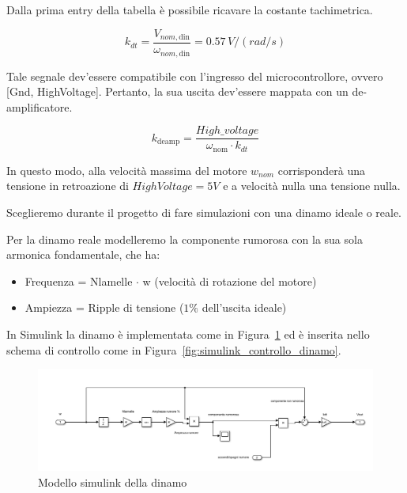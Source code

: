 \documentclass[a4paper,12pt]{article}
\begin{document}
Dalla prima entry della tabella è possibile ricavare la costante tachimetrica.

\[
    k_{dt} = \frac{V_{nom,\text{din}}}{\omega_{nom,\text{din}}} =0.57 \,V/(rad/s)
\]

Tale segnale dev'essere compatibile con l'ingresso del microcontrollore, ovvero [Gnd, HighVoltage]. Pertanto, la sua uscita dev'essere mappata con un de-amplificatore.

\[
    k_{\text{deamp}} = \frac{High\_voltage}{\omega_{\text{nom}} \cdot k_{dt}}
\]

\vspace{0.3cm}

In questo modo, alla velocità massima del motore $w_{nom}$ corrisponderà una tensione in retroazione di $HighVoltage = 5V$ e a velocità nulla una tensione nulla.

\vspace{0.5cm}
 
Sceglieremo durante il progetto di fare simulazioni con una dinamo ideale o reale.

Per la dinamo reale modelleremo la componente rumorosa con la sua sola armonica fondamentale, che ha: 

\begin{itemize}
    \item Frequenza = Nlamelle $\cdot$ w (velocità di rotazione del motore)
    \item Ampiezza = Ripple di tensione ($1\%$ dell'uscita ideale)
\end{itemize}

\vspace{0.5cm}

In Simulink la dinamo è implementata come in Figura~\ref{fig:simulink_dinamo} ed è inserita nello schema di controllo come in Figura~\ref{fig:simulink_controllo_dinamo}.

\begin{figure}[h!]
\centering
    \includegraphics[scale=0.5]{Immagini/Altre/dinamoSimulink.PNG}
    \caption{Modello simulink della dinamo}
    \label{fig:simulink_dinamo}
\end{figure}
\end{document}
